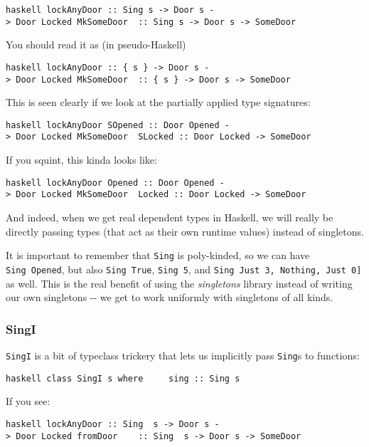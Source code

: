 \documentclass[]{article}
\begin{document}
\texttt{haskell\ lockAnyDoor\ ::\ Sing\ s\ -\textgreater{}\ Door\ s\ -\textgreater{}\ Door\ \textquotesingle{}Locked\ MkSomeDoor\ \ ::\ Sing\ s\ -\textgreater{}\ Door\ s\ -\textgreater{}\ SomeDoor}

You should read it as (in pseudo-Haskell)

\texttt{haskell\ lockAnyDoor\ ::\ \{\ s\ \}\ -\textgreater{}\ Door\ s\ -\textgreater{}\ Door\ \textquotesingle{}Locked\ MkSomeDoor\ \ ::\ \{\ s\ \}\ -\textgreater{}\ Door\ s\ -\textgreater{}\ SomeDoor}

This is seen clearly if we look at the partially applied type signatures:

\texttt{haskell\ lockAnyDoor\ SOpened\ ::\ Door\ \textquotesingle{}Opened\ -\textgreater{}\ Door\ \textquotesingle{}Locked\ MkSomeDoor\ \ SLocked\ ::\ Door\ \textquotesingle{}Locked\ -\textgreater{}\ SomeDoor}

If you squint, this kinda looks like:

\texttt{haskell\ lockAnyDoor\ \textquotesingle{}Opened\ ::\ Door\ \textquotesingle{}Opened\ -\textgreater{}\ Door\ \textquotesingle{}Locked\ MkSomeDoor\ \ \textquotesingle{}Locked\ ::\ Door\ \textquotesingle{}Locked\ -\textgreater{}\ SomeDoor}

And indeed, when we get real dependent types in Haskell, we will really be
directly passing types (that act as their own runtime values) instead of
singletons.

It is important to remember that \texttt{Sing} is poly-kinded, so we can have
\texttt{Sing\ \textquotesingle{}Opened}, but also
\texttt{Sing\ \textquotesingle{}True}, \texttt{Sing\ 5}, and
\texttt{Sing\ \textquotesingle{}{[}\textquotesingle{}Just\ 3,\ \textquotesingle{}Nothing,\ \textquotesingle{}Just\ 0{]}}
as well. This is the real benefit of using the \emph{singletons} library instead
of writing our own singletons -\/- we get to work uniformly with singletons of
all kinds.

\subsubsection{SingI}

\texttt{SingI} is a bit of typeclass trickery that lets us implicitly pass
\texttt{Sing}s to functions:

\texttt{haskell\ class\ SingI\ s\ where\ \ \ \ \ sing\ ::\ Sing\ s}

If you see:

\texttt{haskell\ lockAnyDoor\ ::\ Sing\ \ s\ -\textgreater{}\ Door\ s\ -\textgreater{}\ Door\ \textquotesingle{}Locked\ fromDoor\ \ \ \ ::\ Sing\ \ s\ -\textgreater{}\ Door\ s\ -\textgreater{}\ SomeDoor}
\end{document}
